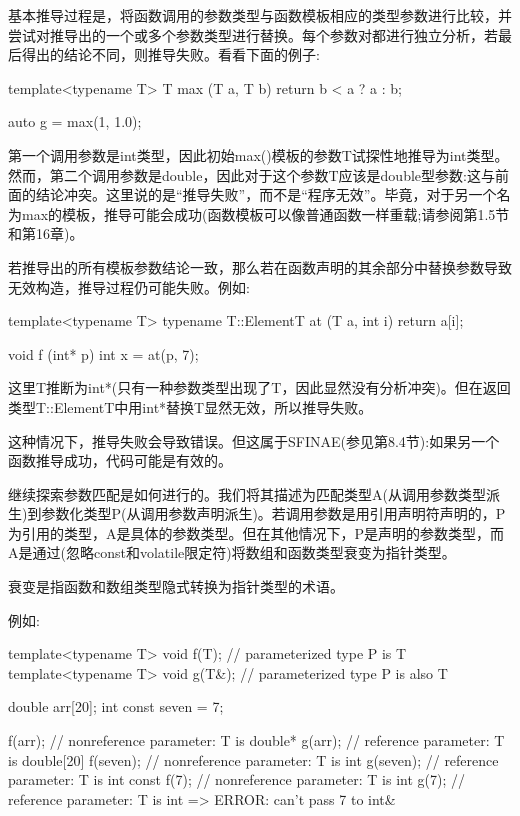 基本推导过程是，将函数调用的参数类型与函数模板相应的类型参数进行比较，并尝试对推导出的一个或多个参数类型进行替换。每个参数对都进行独立分析，若最后得出的结论不同，则推导失败。看看下面的例子:
 
\begin{cpp}
template<typename T>
T max (T a, T b)
{
	return b < a ? a : b;
}

auto g = max(1, 1.0);
\end{cpp} 
 
第一个调用参数是int类型，因此初始max()模板的参数T试探性地推导为int类型。然而，第二个调用参数是double，因此对于这个参数T应该是double型参数:这与前面的结论冲突。这里说的是“推导失败”，而不是“程序无效”。毕竟，对于另一个名为max的模板，推导可能会成功(函数模板可以像普通函数一样重载;请参阅第1.5节和第16章)。
 
若推导出的所有模板参数结论一致，那么若在函数声明的其余部分中替换参数导致无效构造，推导过程仍可能失败。例如:

\begin{cpp}
template<typename T>
typename T::ElementT at (T a, int i)
{
	return a[i];
}

void f (int* p)
{
	int x = at(p, 7);
}
\end{cpp} 

这里T推断为int*(只有一种参数类型出现了T，因此显然没有分析冲突)。但在返回类型T::ElementT中用int*替换T显然无效，所以推导失败。

\begin{notice}这种情况下，推导失败会导致错误。但这属于SFINAE(参见第8.4节):如果另一个函数推导成功，代码可能是有效的。
\end{notice}

继续探索参数匹配是如何进行的。我们将其描述为匹配类型A(从调用参数类型派生)到参数化类型P(从调用参数声明派生)。若调用参数是用引用声明符声明的，P为引用的类型，A是具体的参数类型。但在其他情况下，P是声明的参数类型，而A是通过(忽略const和volatile限定符)将数组和函数类型衰变为指针类型。

\begin{notice}衰变是指函数和数组类型隐式转换为指针类型的术语。
\end{notice}

例如:

\begin{cpp}
template<typename T> void f(T); // parameterized type P is T
template<typename T> void g(T&); // parameterized type P is also T

double arr[20];
int const seven = 7;

f(arr); // nonreference parameter: T is double*
g(arr); // reference parameter: T is double[20]
f(seven); // nonreference parameter: T is int
g(seven); // reference parameter: T is int const
f(7); // nonreference parameter: T is int
g(7); // reference parameter: T is int => ERROR: can’t pass 7 to int&
\end{cpp} 

